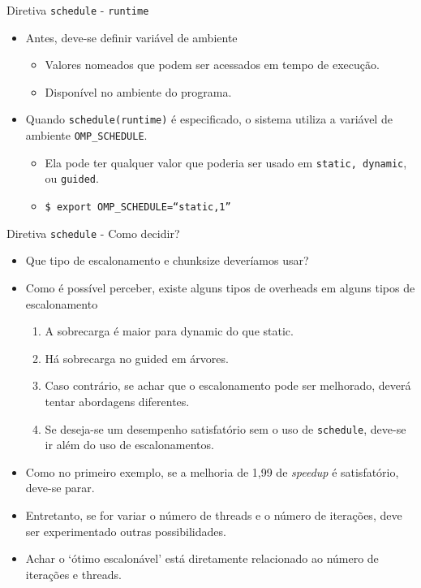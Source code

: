 	\begin{frame}{Diretiva {\tt schedule} - {\tt runtime}}
		\begin{itemize}
			\setlength\itemsep{1.5em}
			\item Antes, deve-se definir variável de ambiente 
			\begin{itemize}
				\setlength\itemsep{0.8em}
				\item Valores nomeados que podem ser acessados em tempo de execução. 
				\item Disponível no ambiente do programa.
			\end{itemize}
			\item Quando {\tt schedule(runtime)} é especificado, o sistema utiliza a variável de ambiente {\tt OMP\_SCHEDULE}.
			\begin{itemize}
				\setlength\itemsep{0.8em}
				\item Ela pode ter qualquer valor que poderia ser usado em {\tt static, dynamic}, ou {\tt guided}.
				\item {\tt \$ export OMP\_SCHEDULE=``static,1''}
			\end{itemize}
		\end{itemize}
	\end{frame}

	\begin{frame}{Diretiva {\tt schedule} - Como decidir?}
		\begin{itemize}
			\item Que tipo de escalonamento e chunksize deveríamos usar?
					\bigskip
			\item Como é possível perceber, existe alguns tipos de overheads em alguns tipos de escalonamento
			\begin{enumerate}
				\item A sobrecarga é maior para dynamic do que static.
				\item Há sobrecarga no guided em árvores.
				\item Caso contrário, se achar que o escalonamento pode ser melhorado, deverá tentar abordagens diferentes.
				\item Se deseja-se um desempenho satisfatório sem o uso de {\tt schedule}, deve-se ir além do uso de escalonamentos.
			\end{enumerate}
						\bigskip
			\item Como no primeiro exemplo, se a melhoria de 1,99 de \textit{speedup} é satisfatório, deve-se parar.
			\item Entretanto, se for variar o número de threads e o número de iterações, deve ser experimentado outras possibilidades. 
			\item Achar o `ótimo escalonável' está diretamente relacionado ao número de iterações e threads.
		\end{itemize}
	\end{frame}

